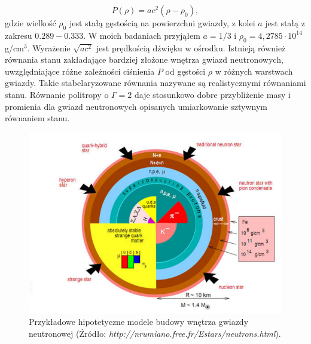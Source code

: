 \documentclass{bachelor_thesis}
\begin{document}
        \begin{equation}
            P(\rho)=ac^{2}(\rho-\rho_0),
            \label{EqMIT}
        \end{equation}
        \indent gdzie wielkość $\rho_0$ jest stałą gęstością na powierzchni gwiazdy, z kolei $a$ jest stałą z zakresu $0.289 - 0.333$. W moich badaniach przyjąłem $a=1/3$ i $\rho_0=4,2785\cdot 10^{14}$ g/cm$^3$. Wyrażenie $\sqrt{ac^2}$ jest prędkością dźwięku w ośrodku. Istnieją również równania stanu zakładające bardziej złożone wnętrza gwiazd neutronowych, uwzględniające różne zależności ciśnienia $P$ od gęstości $\rho$ w różnych warstwach gwiazdy. Takie stabelaryzowane równania nazywane są realistycznymi równaniami stanu. Równanie politropy o $\Gamma=2$ daje stosunkowo dobre przybliżenie masy i promienia dla gwiazd neutronowych opisanych umiarkowanie sztywnym równaniem stanu.
        \begin{figure}[h]
            \centering
            \includegraphics[scale=.42]{figures/RysEOS_examples.png}
            \caption{Przykładowe hipotetyczne modele budowy wnętrza gwiazdy neutronowej (Źródło: \textit{http://nrumiano.free.fr/Estars/neutrons.html}).}
            \label{RysEOS_examples}
        \end{figure}
\end{document}

